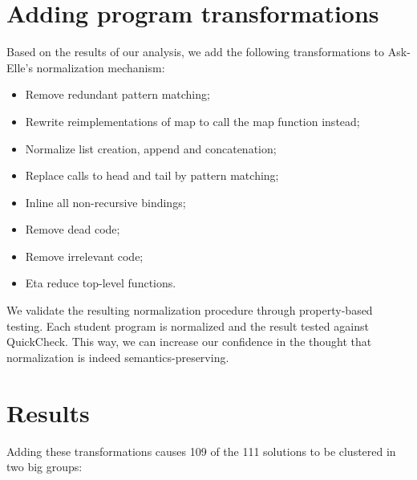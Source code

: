 

\section{Adding program transformations}

Based on the results of our analysis, we add the following transformations to Ask-Elle's normalization mechanism:

\begin{itemize}
    \item Remove redundant pattern matching;
    \item Rewrite reimplementations of map to call the map function instead;
    \item Normalize list creation, append and concatenation;
    \item Replace calls to head and tail by pattern matching;
    \item Inline all non-recursive bindings;
    \item Remove dead code;
    \item Remove irrelevant code;
    \item Eta reduce top-level functions.
\end{itemize}

We validate the resulting normalization procedure through property-based testing. Each student program is normalized and the result tested against QuickCheck. This way, we can increase our confidence in the thought that normalization is indeed semantics-preserving.

\section{Results}

Adding these transformations causes 109 of the 111 solutions to be clustered in two big groups:

